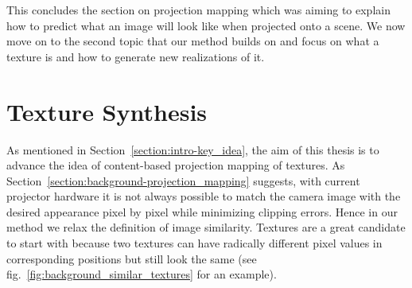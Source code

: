This concludes the section on projection mapping which was aiming to explain how to predict what an image will look like when projected onto a scene. We now move on to the second topic that our method builds on and focus on what a texture is and how to generate new realizations of it.

\section{Texture Synthesis}
\label{section:background-texture_synthesis}

As mentioned in Section~\ref{section:intro-key_idea}, the aim of this thesis is to advance the idea of content-based projection mapping of textures. As Section~\ref{section:background-projection_mapping} suggests, with current projector hardware it is not always possible to match the camera image with the desired appearance pixel by pixel while minimizing clipping errors. Hence in our method we relax the definition of image similarity. Textures are a great candidate to start with because two textures can have radically different pixel values in corresponding positions but still look the same (see fig.~\ref{fig:background_similar_textures} for an example).

